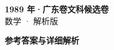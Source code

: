 \documentclass[zihao=-4, a4paper]{ctexart}
\begin{document}
\begin{center}
  {\Large\bfseries 1989 年·广东卷文科候选卷}\\[4pt]
  {\large 数学 · 解析版}
\end{center}
\medskip
{}

\clearpage
{}
\begin{center}{\Large\bfseries 参考答案与详细解析}\end{center}
\medskip

\end{document}
